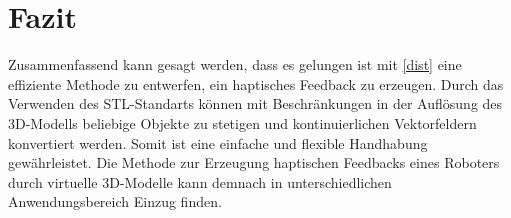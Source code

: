 \documentclass[conference]{IEEEtran}
\begin{document}
\section{Fazit}

Zusammenfassend kann gesagt werden, dass es gelungen ist mit \ref*{dist} eine effiziente Methode zu entwerfen, ein haptisches Feedback zu erzeugen. Durch das Verwenden des STL-Standarts können mit Beschränkungen in der Auflösung des 3D-Modells beliebige Objekte zu stetigen und kontinuierlichen Vektorfeldern konvertiert werden. Somit ist eine einfache und flexible Handhabung gewährleistet. Die Methode zur Erzeugung haptischen Feedbacks eines Roboters durch virtuelle 3D-Modelle kann demnach in unterschiedlichen Anwendungsbereich Einzug finden.  

\printbibliography
\end{document}
